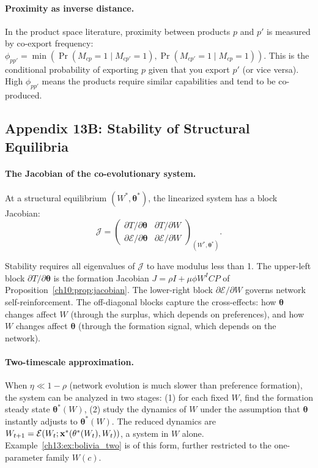 \documentclass[../structural_economics_book.tex]{subfiles}
\begin{document}
\paragraph{Proximity as inverse distance.} In the product space literature, proximity between products $p$ and $p'$ is measured by co-export frequency: $\phi_{pp'} = \min(\Pr(M_{cp} = 1 \mid M_{cp'} = 1), \Pr(M_{cp'} = 1 \mid M_{cp} = 1))$. This is the conditional probability of exporting $p$ given that you export $p'$ (or vice versa). High $\phi_{pp'}$ means the products require similar capabilities and tend to be co-produced.


\subsection*{Appendix 13B: Stability of Structural Equilibria}
\label{ch13:app:stability}

\paragraph{The Jacobian of the co-evolutionary system.} At a structural equilibrium $(W^*, \boldsymbol{\theta}^*)$, the linearized system has a block Jacobian:
\begin{equation}
\mathcal{J} = \begin{pmatrix} \partial T/\partial\boldsymbol{\theta} & \partial T/\partial W \\ \partial\mathcal{E}/\partial\boldsymbol{\theta} & \partial\mathcal{E}/\partial W \end{pmatrix}_{(W^*, \boldsymbol{\theta}^*)}.
\end{equation}

Stability requires all eigenvalues of $\mathcal{J}$ to have modulus less than 1. The upper-left block $\partial T/\partial\boldsymbol{\theta}$ is the formation Jacobian $J = \rho I + \mu\phi W^I C P$ of Proposition~\ref{ch10:prop:jacobian}. The lower-right block $\partial\mathcal{E}/\partial W$ governs network self-reinforcement. The off-diagonal blocks capture the cross-effects: how $\boldsymbol{\theta}$ changes affect $W$ (through the surplus, which depends on preferences), and how $W$ changes affect $\boldsymbol{\theta}$ (through the formation signal, which depends on the network).

\paragraph{Two-timescale approximation.} When $\eta \ll 1-\rho$ (network evolution is much slower than preference formation), the system can be analyzed in two stages: (1) for each fixed $W$, find the formation steady state $\boldsymbol{\theta}^*(W)$, (2) study the dynamics of $W$ under the assumption that $\boldsymbol{\theta}$ instantly adjusts to $\boldsymbol{\theta}^*(W)$. The reduced dynamics are $W_{t+1} = \mathcal{E}(W_t; \mathbf{x}^*(\theta^*(W_t), W_t))$, a system in $W$ alone. Example~\ref{ch13:ex:bolivia_two} is of this form, further restricted to the one-parameter family $W(c)$.
\end{document}
